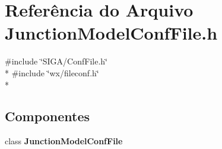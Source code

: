 \section{Referência do Arquivo Junction\+Model\+Conf\+File.\+h}
\label{_junction_model_conf_file_8h}
{\ttfamily \#include \char`\"{}S\+I\+G\+A/\+Conf\+File.\+h\char`\"{}}\\*
{\ttfamily \#include \char`\"{}wx/fileconf.\+h\char`\"{}}\\*
\subsection*{Componentes}
\begin{DoxyCompactItemize}
\item 
class {\bf Junction\+Model\+Conf\+File}
\end{DoxyCompactItemize}
